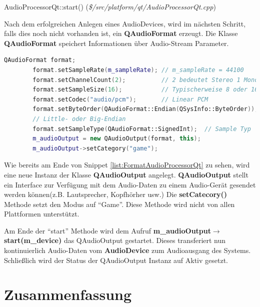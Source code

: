 \documentclass[11pt,a4paper]{scrartcl}
\begin{document}
\vspace{5mm}
\large AudioProcessorQt::start() \normalsize(\textit{\$/src/platform/qt/AudioProcessorQt.cpp})
\vspace{2mm}\newline

Nach dem erfolgreichen Anlegen eines AudioDevices, wird im n\"achsten Schritt, falls dies noch nicht vorhanden ist, ein \textbf{QAudioFormat} erzeugt. Die Klasse \textbf{QAudioFormat} speichert Informationen \"uber Audio-Stream Parameter.

\vspace{5mm}
\begin{lstlisting}[language=C++, caption={Ausschnitt aus AudioProcessorQt::start()}, label={list:FormatAudioProcessorQt}]
    QAudioFormat format;
		format.setSampleRate(m_sampleRate); // m_sampleRate = 44100
		format.setChannelCount(2);			// 2 bedeutet Stereo 1 Mono
		format.setSampleSize(16);			// Typischerweise 8 oder 16
		format.setCodec("audio/pcm");		// Linear PCM
		format.setByteOrder(QAudioFormat::Endian(QSysInfo::ByteOrder));
		// Little- oder Big-Endian
		format.setSampleType(QAudioFormat::SignedInt);	// Sample Typ
		m_audioOutput = new QAudioOutput(format, this);
		m_audioOutput->setCategory("game");
\end{lstlisting}
  
Wie bereits am Ende von Snippet \ref{list:FormatAudioProcessorQt} zu sehen, wird eine neue Instanz der Klasse \textbf{QAudioOutput} angelegt. \textbf{QAudioOutput} stellt ein Interface zur Verf\"ugung mit dem Audio-Daten zu einem Audio-Ger\"at
gesendet werden k\"onnen(z.B. Lautsprecher, Kopfh\"orher usw.) Die \textbf{setCatecory()} Methode setzt den Modus auf "`Game"'. Diese Methode wird nicht von allen Plattformen unterst\"utzt. 

Am Ende der "`start"' Methode wird dem Aufruf \textbf{m\_audioOutput$\rightarrow$start(m\_device)} das QAudioOutput gestartet. Dieses transferiert nun kontinuierlich Audio-Daten vom \textbf{AudioDevice} zum Audioausgang des Systems. 
Schlie{\ss}lich wird der Status der QAudioOutput Instanz auf Aktiv gesetzt.

\newpage


\section{Zusammenfassung} \label{Zusammenfassung}

\end{document}
